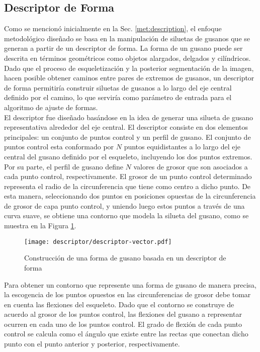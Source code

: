 \subsection{Descriptor de Forma}
\label{sec:metshapedescriptor}

Como se mencion\'o inicialmente en la Sec. \ref{met:description}, 
el enfoque metodol\'ogico dise\~nado se basa en la manipulaci\'on de 
siluetas de gusanos que se generan a partir de un descriptor de forma.
La forma de un gusano puede ser descrita en t\'erminos geom\'etricos
como objetos alargados, delgados y cil\'indricos. Dado que el proceso
de esqueletizaci\'on y la posterior segmentaci\'on de la imagen, hacen
posible obtener caminos entre pares de extremos de gusanos, un descriptor
de forma permitir\'ia construir siluetas de gusanos a lo largo del
eje central definido por el camino, lo que servir\'ia como par\'ametro
de entrada para el algoritmo de ajuste de formas.\\


El descriptor fue dise\~nado bas\'andose en la idea de generar una silueta
de gusano representativa alrededor del eje central. El descriptor consiste en
dos elementos principales: un conjunto de puntos control y un perfil de gusano.
El conjunto de puntos control esta conformado por $N$ puntos equidistantes a lo
largo del eje central del gusano definido por el esqueleto, incluyendo los
dos puntos extremos. Por su parte, el perfil de gusano define $N$ valores de 
grosor que son asociados a cada punto control, respectivamente. El grosor de
un punto control determinado representa el radio de la circunferencia que tiene
como centro a dicho punto. De esta manera, seleccionando dos puntos en posiciones
opuestas de la circunferencia de grosor de capa punto control, y uniendo luego estos
puntos a trav\'es de una curva suave, se obtiene una contorno
que modela la silueta del gusano, como se muestra en la Figura 
\ref{fig:descriptor}. 

\begin{figure}
 \centering
   \texttt{[image: descriptor/descriptor-vector.pdf]}
 \caption{Construcci\'on de una forma de gusano basada en un descriptor de forma}
 \label{fig:descriptor}
\end{figure}

Para obtener un contorno que represente una forma de gusano de manera precisa,
la escogencia de los puntos opuestos en las circunferencias de grosor
debe tomar en cuenta las flexiones del esqueleto. Dado que el contorno se
construye de acuerdo al grosor de los puntos control, las flexiones del gusano
a representar ocurren en cada uno de los puntos control. El grado de flexi\'on
de cada punto control se calcula como el \'angulo que existe entre las rectas
que conectan dicho punto con el punto anterior y posterior, respectivamente.\\

